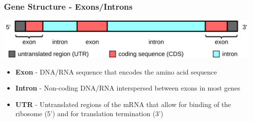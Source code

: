 \documentclass{beamer}
\begin{document}
\begin{frame}
	\frametitle{Gene Structure - Exons/Introns}
			\centering	\includegraphics[keepaspectratio, width  = \textwidth]{img/geneStructureCartoon}\\ 
			
			\begin{itemize}
				\item \textbf{Exon} - DNA/RNA sequence that encodes the amino acid sequence
				\item \textbf{Intron} - Non-coding DNA/RNA interspersed between exons in most genes
				\item \textbf{UTR} - Untranslated regions of the mRNA that allow for binding of the ribosome (5') and for translation termination (3')
			\end{itemize}
\end{frame}
\end{document}
